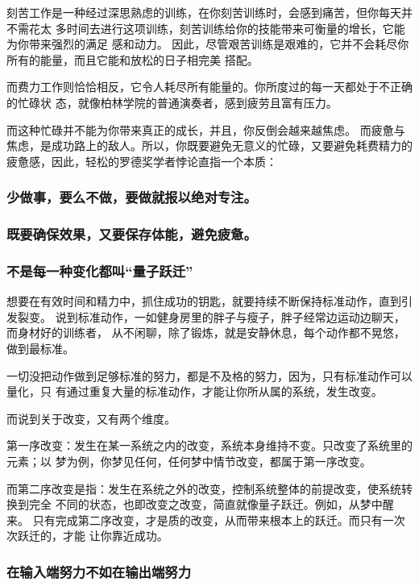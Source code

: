 \documentclass[11pt]{ctexart}
\begin{document}
{{{{刻苦工作是一种经过深思熟虑的训练，在你刻苦训练时，会感到痛苦，但你每天并不需花太
多时间去进行这项训练，刻苦训练给你的技能带来可衡量的增长，它能为你带来强烈的满足
感和动力。
因此，尽管艰苦训练是艰难的，它并不会耗尽你所有的能量，而且它能和放松的日子相完美
搭配。

而费力工作则恰恰相反，它令人耗尽所有能量的。你所度过的每一天都处于不正确的忙碌状
态，就像柏林学院的普通演奏者，感到疲劳且富有压力。

而这种忙碌并不能为你带来真正的成长，并且，你反倒会越来越焦虑。
而疲惫与焦虑，是成功路上的敌人。所以，你既要避免无意义的忙碌，又要避免耗费精力的
疲惫感，因此，轻松的罗德奖学者悖论直指一个本质：

\subsubsection{少做事，要么不做，要做就报以绝对专注。}
\label{sec:org4e295d4}

\subsubsection{既要确保效果，又要保存体能，避免疲惫。}
\label{sec:orgeb12df4}

\subsubsection{不是每一种变化都叫“量子跃迁”}
\label{sec:org2ab3e1f}

想要在有效时间和精力中，抓住成功的钥匙，就要持续不断保持标准动作，直到引发裂变。
说到标准动作，一如健身房里的胖子与瘦子，胖子经常边运动边聊天，而身材好的训练者，
从不闲聊，除了锻炼，就是安静休息，每个动作都不晃悠，做到最标准。

一切没把动作做到足够标准的努力，都是不及格的努力，因为，只有标准动作可以量化，只
有通过重复大量的标准动作，才能让你所从属的系统，发生改变。

而说到关于改变，又有两个维度。

第一序改变：发生在某一系统之内的改变，系统本身维持不变。只改变了系统里的元素；以
梦为例，你梦见任何，任何梦中情节改变，都属于第一序改变。

而第二序改变是指：发生在系统之外的改变，控制系统整体的前提改变，使系统转换到完全
不同的状态，也即改变之改变，简直就像量子跃迁。例如，从梦中醒来。
只有完成第二序改变，才是质的改变，从而带来根本上的跃迁。而只有一次次跃迁的，才能
让你靠近成功。

\subsubsection{在输入端努力不如在输出端努力}
\label{sec:org6eee9a4}

}}}}
\end{document}
